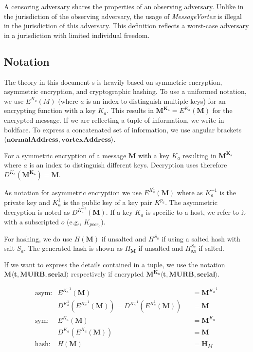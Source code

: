 \documentclass[acmsmall, screen, final, natbib=false]{acmart}
\begin{document}
	A censoring adversary shares the properties of an observing adversary. Unlike in the jurisdiction of the observing adversary, the usage of \emph{MessageVortex} is illegal in the jurisdiction of this adversary. This definition reflects a worst-case adversary in a jurisdiction with limited individual freedom. 
	
	\subsection{Notation \label{sec:encNot}}
	The theory in this document s is heavily based on symmetric encryption, asymmetric encryption, and cryptographic hashing. To use a uniformed notation, we use $E^{K_a}(M)$ (where $a$ is an index to distinguish multiple keys) for an encrypting function with a key $K_a$. This results in $\mathbf{M^{K_a}}=E^{K_a}(\mathbf{M})$ for the encrypted message. If we are reflecting a tuple of information, we write in boldface. To express a concatenated set of information, we use angular brackets $\mathbf{\langle normalAddress,vortexAddress\rangle }$. 
	
	For a symmetric encryption of a message $\mathbf{M}$ with a key $K_a$ resulting in $\mathbf{M^{K_a}}$ where $a$ is an index to distinguish different keys. Decryption uses therefore $D^{K_a}(\mathbf{M^{K_a}})=\mathbf{M}$.
	
	As notation for asymmetric encryption we use $E^{K^{1}_a}(\mathbf{M})$ where as $K^{-1}_a$ is the private key and $K^{1}_a$ is the public key of a key pair $K^{p_a}$. The asymmetric decryption is noted as $D^{K^{-1}_a}(\mathbf{M})$. If a key $K_a$ is specific to a host, we refer to it with a subscripted $o$ (e.g., $K_{peer_o}$).
	
	For hashing, we do use $H(\mathbf{M})$ if unsalted and $H^{S_a}$ if using a salted hash with salt $S_a$. The generated hash is shown as $H_\mathbf{M}$ if unsalted and $H^{S_a}_\mathbf{M}$ if salted.
	
	If we want to express the details contained in a tuple, we use the notation $\mathbf{M\langle t,MURB,serial\rangle}$ respectively if encrypted $\mathbf{M^{K_{a}}\langle t,MURB,serial\rangle}$.
	
	\begin{align*}
	\text{asym:}         & E^{K^{-1}_a}\left(\mathbf{M}\right)                           && =\mathbf{M}^{K^{-1}_a}\\
	& D^{K^{1}_a}\left(E^{K^{-1}_a}\left(\mathbf{M}\right)\right) = D^{K^{-1}_a}\left(E^{K^{1}_a}\left(\mathbf{M}\right)\right)        && =\mathbf{M}\\
	\text{sym:}          & E^{K_a}\left(\mathbf{M}\right)                                && =\mathbf{M}^{K_a}\\
	& D^{K_a}\left(E^{K_a}\left(\mathbf{M}\right)\right)               && =\mathbf{M}\\
	\text{hash:}         & H\left(\mathbf{M}\right)                                      && =\mathbf{H}_M
	\end{align*}
	
\end{document}
